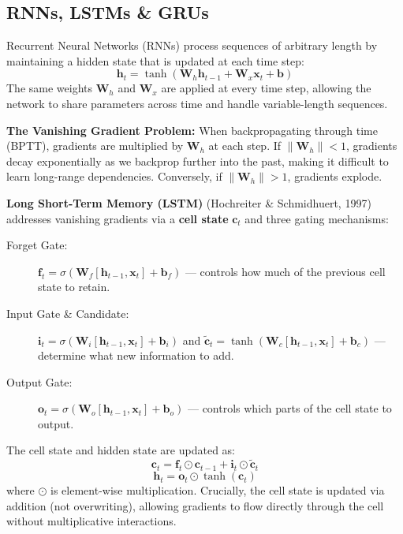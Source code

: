 \subsection{RNNs, LSTMs \& GRUs}

Recurrent Neural Networks (RNNs) process sequences of arbitrary length by maintaining a hidden state that is updated at each time step:
\[
\mathbf{h}_t = \tanh(\mathbf{W}_h \mathbf{h}_{t-1} + \mathbf{W}_x \mathbf{x}_t + \mathbf{b})
\]
The same weights $\mathbf{W}_h$ and $\mathbf{W}_x$ are applied at every time step, allowing the network to share parameters across time and handle variable-length sequences.

\textbf{The Vanishing Gradient Problem:} When backpropagating through time (BPTT), gradients are multiplied by $\mathbf{W}_h$ at each step. If $\|\mathbf{W}_h\| < 1$, gradients decay exponentially as we backprop further into the past, making it difficult to learn long-range dependencies. Conversely, if $\|\mathbf{W}_h\| > 1$, gradients explode.

\textbf{Long Short-Term Memory (LSTM)} (Hochreiter \& Schmidhuert, 1997) addresses vanishing gradients via a \textbf{cell state} $\mathbf{c}_t$ and three gating mechanisms:

\begin{description}
  \item[Forget Gate:] $\mathbf{f}_t = \sigma(\mathbf{W}_f [\mathbf{h}_{t-1}, \mathbf{x}_t] + \mathbf{b}_f)$ --- controls how much of the previous cell state to retain.

  \item[Input Gate \& Candidate:] $\mathbf{i}_t = \sigma(\mathbf{W}_i [\mathbf{h}_{t-1}, \mathbf{x}_t] + \mathbf{b}_i)$ and $\tilde{\mathbf{c}}_t = \tanh(\mathbf{W}_c [\mathbf{h}_{t-1}, \mathbf{x}_t] + \mathbf{b}_c)$ --- determine what new information to add.

  \item[Output Gate:] $\mathbf{o}_t = \sigma(\mathbf{W}_o [\mathbf{h}_{t-1}, \mathbf{x}_t] + \mathbf{b}_o)$ --- controls which parts of the cell state to output.
\end{description}

The cell state and hidden state are updated as:
\[
\mathbf{c}_t = \mathbf{f}_t \odot \mathbf{c}_{t-1} + \mathbf{i}_t \odot \tilde{\mathbf{c}}_t
\]
\[
\mathbf{h}_t = \mathbf{o}_t \odot \tanh(\mathbf{c}_t)
\]
where $\odot$ is element-wise multiplication. Crucially, the cell state is updated via addition (not overwriting), allowing gradients to flow directly through the cell without multiplicative interactions.

